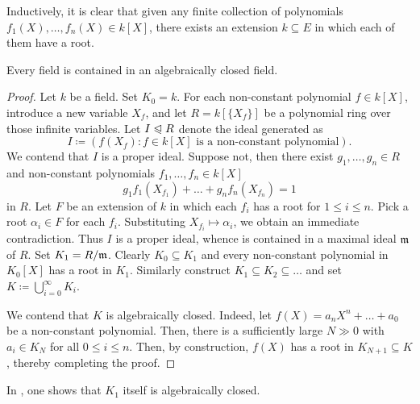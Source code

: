 \begin{corollary}
    Inductively, it is clear that given any finite collection of polynomials $f_1(X),\dots, f_n(X)\in k[X]$, there exists an extension $k\subseteq E$ in which each of them have a root.
\end{corollary}

\begin{theorem}[Artin]
    Every field is contained in an algebraically closed field. 
\end{theorem}
\begin{proof}
    Let $k$ be a field. Set $K_0 = k$. For each non-constant polynomial $f\in k[X]$, introduce a new variable $X_f$, and let $R = k[\{X_f\}]$ be a polynomial ring over those infinite variables. Let $I\trianglelefteqslant R$ denote the ideal generated as 
    \begin{equation*}
        I\coloneq\left(f(X_f)\colon f\in k[X]\text{ is a non-constant polynomial}\right).
    \end{equation*}
    We contend that $I$ is a proper ideal. Suppose not, then there exist $g_1,\dots,g_n\in R$ and non-constant polynomials $f_1,\dots,f_n\in k[X]$ 
    \begin{equation*}
        g_1f_1(X_{f_1}) + \dots + g_nf_n(X_{f_n}) = 1
    \end{equation*}
    in $R$. Let $F$ be an extension of $k$ in which each $f_i$ has a root for $1\le i\le n$. Pick a root $\alpha_i\in F$ for each $f_i$. Substituting $X_{f_i}\mapsto\alpha_i$, we obtain an immediate contradiction. Thus $I$ is a proper ideal, whence is contained in a maximal ideal $\mathfrak{m}$ of $R$. Set $K_1 = R/\mathfrak{m}$. Clearly $K_0\subseteq K_1$ and every non-constant polynomial in $K_0[X]$ has a root in $K_1$. Similarly construct $K_1\subseteq K_2\subseteq \dots$ and set $K\coloneq\displaystyle\bigcup_{i = 0}^\infty K_i$. 

    We contend that $K$ is algebraically closed. Indeed, let $f(X) = a_nX^n + \dots + a_0$ be a non-constant polynomial. Then, there is a sufficiently large $N\gg 0$ with $a_i\in K_N$ for all $0\le i\le n$. Then, by construction, $f(X)$ has a root in $K_{N + 1}\subseteq K$, thereby completing the proof.
\end{proof}

\begin{remark}
    In \cite[Chapter VI, Exercise 28]{lang-algebra}, one shows that $K_1$ itself is algebraically closed.
\end{remark}

